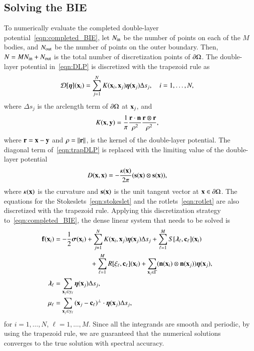 \documentclass[preprint, 10pt]{elsarticle}
\begin{document}
\subsection{Solving the BIE}
\label{sec:BIE}

To numerically evaluate the completed double-layer
potential~\eqref{eqn:completed_BIE}, let $N_{\mathrm{in}}$ be the number of
points on each of the $M$ bodies, and $N_{\mathrm{out}}$ be the number of points
on the outer boundary.  Then, $N = MN_{\mathrm{in}} + N_{\mathrm{out}}$ is the total number
of discretization points of ${\partial}\Omega$.  The double-layer potential
in~\eqref{eqn:DLP} is discretized with the trapezoid rule as
\begin{align}
  {\mathcal{D}}[{\boldsymbol\eta}]({\mathbf{x}}_i) = \sum_{j=1}^{N} K({\mathbf{x}}_i,{\mathbf{x}}_j) {\boldsymbol\eta}({\mathbf{x}}_j) 
      \Delta s_{j}, \quad i=1,\ldots,N,
  \label{eqn:trapDLP}
\end{align}
where $\Delta s_j$ is the arclength term of ${\partial}\Omega$ at
${\mathbf{x}}_j$, and
\begin{align*}
  K({\mathbf{x}},{\mathbf{y}}) = \frac{1}{\pi} \frac{{\mathbf{r}} \cdot {\mathbf{n}}}{\rho^2} 
      \frac{{\mathbf{r}} \otimes {\mathbf{r}}}{\rho^2},
\end{align*}
where ${\mathbf{r}} = {\mathbf{x}} - {\mathbf{y}}$ and $\rho = \|{\mathbf{r}}\|$, is the kernel of the
double-layer potential.  The diagonal term of~\eqref{eqn:trapDLP} is
replaced with the limiting value of the double-layer potential
\begin{align*}
  D({\mathbf{x}},{\mathbf{x}}) = -\frac{\kappa({\mathbf{x}})}{2\pi}({\mathbf{s}}({\mathbf{x}}) \otimes {\mathbf{s}}({\mathbf{x}})),
\end{align*}
where $\kappa({\mathbf{x}})$ is the curvature and ${\mathbf{s}}({\mathbf{x}})$ is the unit tangent
vector at ${\mathbf{x}} \in {\partial}\Omega$.  The equations for the
Stokeslets~\eqref{eqn:stokeslet} and the rotlets~\eqref{eqn:rotlet} are
also discretized with the trapezoid rule.  Applying this discretization
strategy to~\eqref{eqn:completed_BIE}, the dense linear system that
needs to be solved is
\begin{equation}
  \label{eqn:completed_BIE_discretized}
  \begin{aligned}
    {\mathbf{f}}({\mathbf{x}}_i) &= -\frac{1}{2}{\boldsymbol\sigma}({\mathbf{x}}_i) + \sum_{j=1}^{N} 
      K({\mathbf{x}}_i,{\mathbf{x}}_j) {\boldsymbol\eta}({\mathbf{x}}_j) \Delta s_{j} + 
      \sum_{\ell=1}^M S[{\boldsymbol\lambda}_\ell,{\mathbf{c}}_\ell]({\mathbf{x}}_i) \\
      &\hspace{53pt}
      +\sum_{\ell=1}^M R[\xi_\ell,{\mathbf{c}}_\ell]({\mathbf{x}}_i) 
      +\sum_{{\mathbf{x}}_j \in \Gamma} ({\mathbf{n}}({\mathbf{x}}_i) \otimes
      {\mathbf{n}}({\mathbf{x}}_j)){\boldsymbol\eta}({\mathbf{x}}_j), \\
    {\boldsymbol\lambda}_\ell &= \sum_{{\mathbf{x}}_j \in \gamma_\ell} {\boldsymbol\eta}({\mathbf{x}}_j) 
      \Delta s_j, \\ 
    \mu_\ell &= \sum_{{\mathbf{x}}_j \in \gamma_\ell}
      {({\mathbf{x}}_j - {\mathbf{c}}_\ell)}^\perp \cdot {\boldsymbol\eta}({\mathbf{x}}_j) \Delta s_j,
  \end{aligned}
\end{equation}
for $i=1,\ldots,N$, $\ell=1,\ldots,M$.  Since all the integrands are
smooth and periodic, by using the trapezoid rule, we are guaranteed that
the numerical solutions converges to the true solution with spectral
accuracy.
\end{document}
